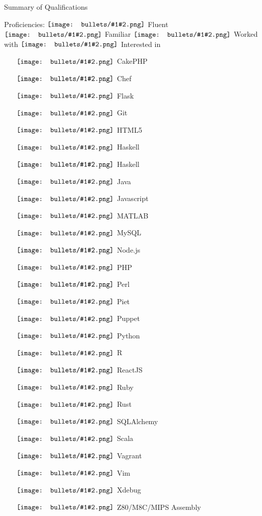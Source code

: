 \documentclass[letterpaper,10pt]{article}
\newcommand{\gbullet}[2][circle]{
  \vcenter{\hbox{\texttt{[image: bullets/\#1\#2.png]}}}
}
\begin{document}
\begin{res_section}{Summary of Qualifications}
\begin{res_content}{Proficiencies: \small \hfill $\gbullet{4}$ Fluent $\gbullet{3}$ Familiar $\gbullet{2}$ Worked with $\gbullet{1}$ Interested in}
\begin{multicols}{5}
\begin{itemize}
    \item[$\gbullet{4}$] CakePHP
    \item[$\gbullet{3}$] Chef
    \item[$\gbullet{3}$] Flask
    \item[$\gbullet{4}$] Git
    \item[$\gbullet{4}$] HTML5
    \item[$\gbullet{2}$] Haskell
    \item[$\gbullet{2}$] Haskell
    \item[$\gbullet{3}$] Java
    \item[$\gbullet{4}$] Javascript
    \item[$\gbullet{2}$] MATLAB
    \item[$\gbullet{4}$] MySQL
    \item[$\gbullet{3}$] Node.js
    \item[$\gbullet{4}$] PHP
    \item[$\gbullet{3}$] Perl
    \item[$\gbullet{2}$] Piet
    \item[$\gbullet{4}$] Puppet
    \item[$\gbullet{4}$] Python
    \item[$\gbullet{3}$] R
    \item[$\gbullet{3}$] ReactJS
    \item[$\gbullet{2}$] Ruby
    \item[$\gbullet{1}$] Rust
    \item[$\gbullet{3}$] SQLAlchemy
    \item[$\gbullet{1}$] Scala
    \item[$\gbullet{4}$] Vagrant
    \item[$\gbullet{4}$] Vim
    \item[$\gbullet{4}$] Xdebug
    \item[$\gbullet{2}$] Z80/M8C/MIPS Assembly
  \end{itemize}
  \end{multicols}
\end{res_content}
\end{res_section}
\end{document}
